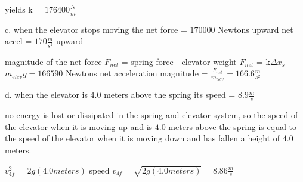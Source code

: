 yields k = $176400 \frac{N}{m}$
                                                       
c. when the elevator stops moving the net force = $170000$ Newtons upward   net accel = $170 \frac{m}{s^{2}}$ upward
                                                    
magnitude of the net force $F_{net}$ = spring force - elevator weight
$F_{net}$ = k$\Delta x_{s}$ - $m_{elev}g = 166590$ Newtons         
net acceleration magnitude = $\frac{F_{net}}{m_{elev}} = 166.6 \frac{m}{s^{2}}$
                                                                           
d. when the elevator is $4.0$ meters above the spring its speed = $8.9 \frac{m}{s}$
                                                                      
no energy is lost or dissipated in the spring and elevator system, so the speed of the elevator when it is
moving up and is $4.0$ meters above the spring is equal to the speed of the elevator when it is moving down
and has fallen a height of $4.0$ meters.

$v_{4f}^{2}$ = $2g(4.0 meters)$
speed $v_{4f} = \sqrt{2g(4.0 meters)} = 8.86 \frac{m}{s}$

